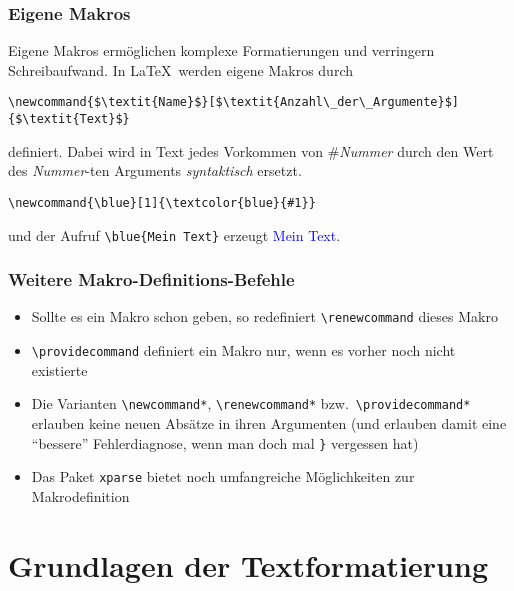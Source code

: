 \begin{frame}[fragile]
  \frametitle{Eigene Makros}
  \onslide<+->

  Eigene Makros ermöglichen komplexe Formatierungen und verringern Schreibaufwand.  In
  \LaTeX\ werden eigene Makros durch
\begin{lstlisting}
\newcommand{$\textit{Name}$}[$\textit{Anzahl\_der\_Argumente}$]{$\textit{Text}$}
\end{lstlisting}
  definiert. Dabei wird in Text jedes Vorkommen von \#\emph{Nummer} durch den Wert des
  \emph{Nummer}-ten Arguments \emph{syntaktisch} ersetzt.

  \onslide<+->

  \begin{Beispiel}
\begin{lstlisting}
\newcommand{\blue}[1]{\textcolor{blue}{#1}}
\end{lstlisting}
    und der Aufruf \lstinline!\blue{Mein Text}! erzeugt \textcolor{blue}{Mein Text}.
  \end{Beispiel}
\end{frame}

\begin{frame}[fragile]
  \frametitle{Weitere Makro-Definitions-Befehle}

  \onslide<+->

  \begin{itemize}[<+->]
  \item Sollte es ein Makro schon geben, so redefiniert \lstinline!\renewcommand!
    dieses Makro
  \item \lstinline!\providecommand! definiert ein Makro nur, wenn es vorher noch nicht
    existierte
  \item Die Varianten \lstinline!\newcommand*!, \lstinline!\renewcommand*! bzw.\,
    \lstinline!\providecommand*! erlauben keine neuen Absätze in ihren Argumenten (und
    erlauben damit eine \enquote{bessere} Fehlerdiagnose, wenn man doch mal
    \texttt{\}} vergessen hat)
  \item Das Paket \texttt{xparse} bietet noch umfangreiche Möglichkeiten zur
    Makrodefinition
  \end{itemize}
\end{frame}

\section{Grundlagen der Textformatierung}

